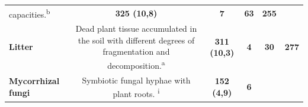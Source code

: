 \documentclass[10pt,oneside]{article}
\begin{document}
\begin{longtable}[]{@{}lccccc@{}}
\begin{minipage}[t]{0.45\columnwidth}
capacities.\textsuperscript{b}\strut
\end{minipage} & \begin{minipage}[t]{0.14\columnwidth}\centering
\textbf{325 (10,8)}\strut
\end{minipage} & \begin{minipage}[t]{0.04\columnwidth}\centering
\textbf{7}\strut
\end{minipage} & \begin{minipage}[t]{0.04\columnwidth}\centering
\textbf{63}\strut
\end{minipage} & \begin{minipage}[t]{0.04\columnwidth}\centering
\textbf{255}\strut
\end{minipage}\tabularnewline
\begin{minipage}[t]{0.11\columnwidth}\raggedright
\textbf{Litter}\strut
\end{minipage} & \begin{minipage}[t]{0.45\columnwidth}\centering
Dead plant tissue accumulated in the soil with different degrees of
fragmentation and decomposition.\textsuperscript{a}\strut
\end{minipage} & \begin{minipage}[t]{0.14\columnwidth}\centering
\textbf{311 (10,3)}\strut
\end{minipage} & \begin{minipage}[t]{0.04\columnwidth}\centering
\textbf{4}\strut
\end{minipage} & \begin{minipage}[t]{0.04\columnwidth}\centering
\textbf{30}\strut
\end{minipage} & \begin{minipage}[t]{0.04\columnwidth}\centering
\textbf{277}\strut
\end{minipage}\tabularnewline
\begin{minipage}[t]{0.11\columnwidth}\raggedright
\textbf{Mycorrhizal fungi}\strut
\end{minipage} & \begin{minipage}[t]{0.45\columnwidth}\centering
Symbiotic fungal hyphae with plant roots. \textsuperscript{i}\strut
\end{minipage} & \begin{minipage}[t]{0.14\columnwidth}\centering
\textbf{152 (4,9)}\strut
\end{minipage} & \begin{minipage}[t]{0.04\columnwidth}\centering
\textbf{6}\strut
\end{minipage} & \begin{minipage}[t]{0.04\columnwidth}\centering

\end{minipage}
\end{longtable}
\end{document}
